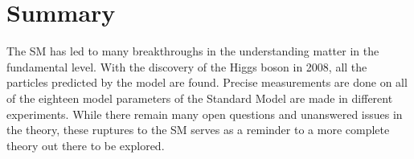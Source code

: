 \section{Summary}
The SM has led to many breakthroughs in the understanding matter in the fundamental level. With the discovery of the Higgs boson in 2008, all the particles predicted by the model are found. Precise measurements are done on all of the eighteen model parameters of the Standard Model are made in different experiments. While there remain many open questions and unanswered issues in the theory, these ruptures to the SM serves as a reminder to a more complete theory out there to be explored.




%



